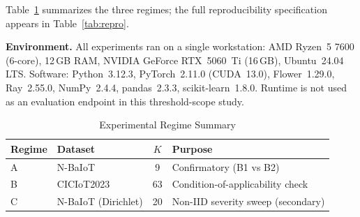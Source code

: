 Table~\ref{tab:regimes} summarizes the three regimes; the full reproducibility
specification appears in Table~\ref{tab:repro}.

\textbf{Environment.}
All experiments ran on a single workstation: AMD Ryzen~5 7600 (6-core), 12\,GB RAM,
NVIDIA GeForce RTX~5060~Ti (16\,GB), Ubuntu~24.04 LTS.
Software: Python~3.12.3, PyTorch~2.11.0 (CUDA~13.0), Flower~1.29.0,
Ray~2.55.0, NumPy~2.4.4, pandas~2.3.3, scikit-learn~1.8.0.
Runtime is not used as an evaluation endpoint in this threshold-scope study.

\begin{table}[t]
  \caption{Experimental Regime Summary}
  \label{tab:regimes}
  \centering
  \footnotesize
  \setlength{\tabcolsep}{5pt}%
  \renewcommand{\arraystretch}{1.2}%
  \begin{tabular}{@{}llcl@{}}
    \toprule
    Regime & Dataset & $K$ & Purpose \\
    \midrule
    A & N-BaIoT & 9 & Confirmatory (B1 vs B2) \\
    B & CICIoT2023 & 63 & Condition-of-applicability check \\
    C & N-BaIoT (Dirichlet) & 20 & Non-IID severity sweep (secondary) \\
    \bottomrule
  \end{tabular}
\end{table}

